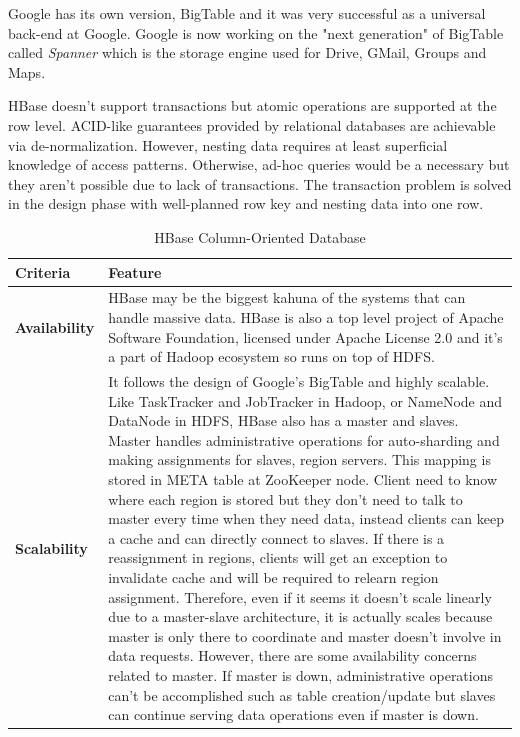 Google has its own version, BigTable and it was very successful as a universal back-end at Google. Google is now working on the "next generation" of BigTable called \textit{Spanner}\cite{spanner} which is the storage engine used for Drive, GMail, Groups and Maps.

HBase doesn't support transactions but atomic operations are supported at the row level. ACID-like guarantees provided by relational databases are achievable via de-normalization. However, nesting data requires at least superficial knowledge of access patterns. Otherwise, ad-hoc queries would be a necessary but they aren't possible due to lack of transactions. The transaction problem is solved in the design phase with well-planned row key and nesting data into one row.

\begin{table}[!ht]
  \centering
  \caption{HBase Column-Oriented Database}
  \renewcommand{\arraystretch}{1.5}
  \begin{tabular}{| >{\centering\bfseries}m{1in} | >{\centering\arraybackslash}m{4.5in} |}
	\hline
    \textbf{Criteria} & \textbf{Feature} \\
	\hline
    Availability &
    HBase may be the biggest kahuna of the systems that can handle massive data.
    HBase is also a top level project of Apache Software Foundation, licensed under Apache License 2.0 and it's a part of Hadoop ecosystem so runs on top of HDFS.
    \\ \hline
    Scalability &
    It follows the design of Google's BigTable and highly scalable.
    Like TaskTracker and JobTracker in Hadoop, or NameNode and DataNode in HDFS, HBase also has a master and slaves.
    Master handles administrative operations for auto-sharding and making assignments for slaves, region servers.
    This mapping is stored in META table at ZooKeeper node.
    Client need to know where each region is stored but they don't need to talk to master every time when they need data, instead clients can keep a cache and can directly connect to slaves.
    If there is a reassignment in regions, clients will get an exception to invalidate cache and will be required to relearn region assignment.
    Therefore, even if it seems it doesn't scale linearly due to a master-slave architecture, it is actually scales because master is only there to coordinate and master doesn't involve in data requests.
    However, there are some availability concerns related to master.
    If master is down, administrative operations can't be accomplished such as table creation/update but slaves can continue serving data operations even if master is down.

\end{tabular}
\end{table}
